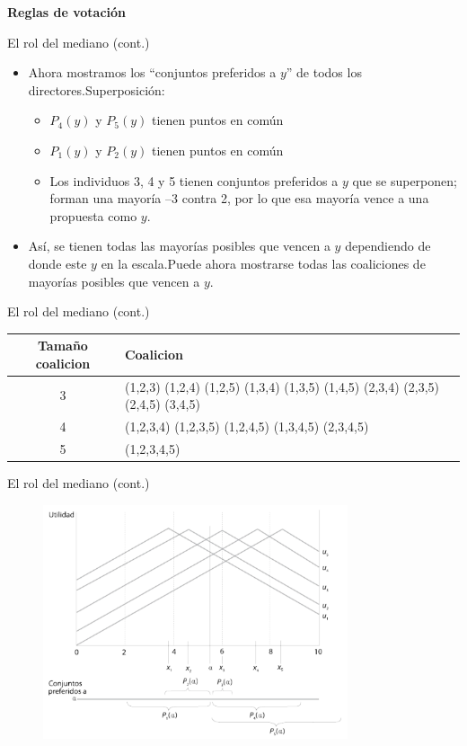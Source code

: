 \documentclass[
  ignorenonframetext,
]{beamer}
\providecommand{\tightlist}{%
  \setlength{\itemsep}{0pt}\setlength{\parskip}{0pt}}\usepackage{longtable,booktabs,array}
\begin{document}
\begin{frame}{\textbf{Reglas de votación}}
\begin{block}{El rol del mediano (cont.)}
\protect\hypertarget{el-rol-del-mediano-cont.-4}{}
\begin{itemize}
\tightlist
\item
  Ahora mostramos los ``conjuntos preferidos a \(y\)'' de todos los
  directores.Superposición:

  \begin{itemize}
  \tightlist
  \item
    \(P_4(y)\) y \(P_5(y)\) tienen puntos en común
  \item
    \(P_1(y)\) y \(P_2(y)\) tienen puntos en común
  \item
    Los individuos 3, 4 y 5 tienen conjuntos preferidos a \(y\) que se
    superponen; forman una mayoría --3 contra 2, por lo que esa mayoría
    vence a una propuesta como \(y\).
  \end{itemize}
\item
  Así, se tienen todas las mayorías posibles que vencen a \(y\)
  dependiendo de donde este \(y\) en la escala.Puede ahora mostrarse
  todas las coaliciones de mayorías posibles que vencen a \(y\).
\end{itemize}
\end{block}

\begin{block}{El rol del mediano (cont.)}
\protect\hypertarget{el-rol-del-mediano-cont.-5}{}
\hypertarget{tab:1}{}
\begin{longtable}[]{@{}cl@{}}
\toprule()
Tamaño coalicion & Coalicion \\
\midrule()
\endhead
3 & (1,2,3) (1,2,4) (1,2,5) (1,3,4) (1,3,5) (1,4,5) (2,3,4) (2,3,5)
(2,4,5) (3,4,5) \\
4 & (1,2,3,4) (1,2,3,5) (1,2,4,5) (1,3,4,5) (2,3,4,5) \\
5 & (1,2,3,4,5) \\
\bottomrule()
\end{longtable}
\end{block}

\begin{block}{El rol del mediano (cont.)}
\protect\hypertarget{el-rol-del-mediano-cont.-6}{}
\begin{figure}

{\centering \includegraphics[width=0.8\textwidth,height=\textheight]{../epol/fig/fig-02-009.png}

}
\end{figure}
\end{block}
\end{frame}
\end{document}
